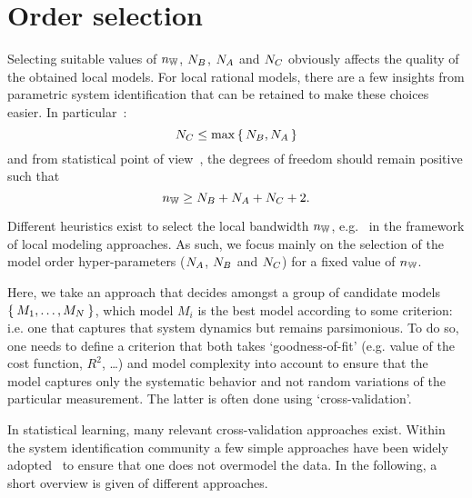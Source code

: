 \section{Order selection}
Selecting suitable values of $n_{\mathbb{W}}$, $N_{B}$, $N_{A}$ and $N_{C}$ obviously affects the quality of the obtained local models.
For local rational models, there are a few insights from parametric system identification that can be retained to make these choices easier.
In particular~\citep{Pintelon2010LPM1}:
\begin{equation}
N_{C} \leq \max\set{\ensuremath{N_{B}},\ensuremath{N_{A}}}
\end{equation}
 and from statistical point of view~\citep{Mahata2006}, the degrees of freedom should remain positive such that 
 \begin{equation}
 n_{\mathbb{W}} \geq N_{B} + N_{A} + N_{C} + 2
 \text{.}
 \end{equation}
 
Different heuristics exist to select the local bandwidth $n_{\mathbb{W}}$, e.g.~\citet{Fan1995,Thummala2012LPMBW,Stenman2000ASETFE} in the framework of local modeling approaches.
As such, we focus mainly on the selection of the model order hyper-parameters ($N_{A}$, $N_{B}$ and $N_{C}$) for a fixed value of $n_{\mathbb{W}}$.

Here, we take an approach that decides amongst a group of candidate models $\Set{M_1, \ldots, M_N}$, which model $M_i$ is the best model according to some criterion: i.e. one that captures that system dynamics but remains parsimonious.
To do so, one needs to define a criterion that both takes `goodness-of-fit' (e.g. value of the cost function, $R^2$, \ldots) and model complexity into account to ensure that the model captures only the systematic behavior and not random variations of the particular measurement.
The latter is often done using `cross-validation'.

In statistical learning, many relevant cross-validation approaches exist.
Within the system identification community a few simple approaches have been widely adopted~\citep[Chapter 11]{Pintelon2012} to ensure that one does not overmodel the data.
In the following, a short overview is given of different approaches.

